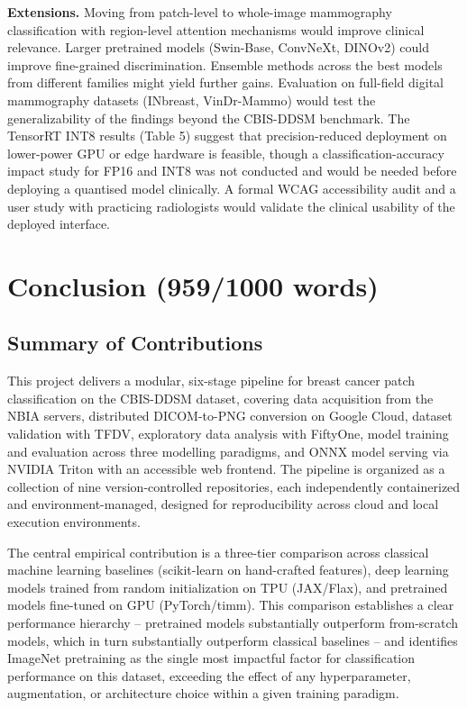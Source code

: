 \documentclass[justified,notoc,openany]{tufte-book}
\begin{document}
\textbf{Extensions.} Moving from patch-level to whole-image mammography classification with region-level attention mechanisms would improve clinical relevance. Larger pretrained models (Swin-Base, ConvNeXt, DINOv2) could improve fine-grained discrimination. Ensemble methods across the best models from different families might yield further gains. Evaluation on full-field digital mammography datasets (INbreast, VinDr-Mammo) would test the generalizability of the findings beyond the CBIS-DDSM benchmark. The TensorRT INT8 results (Table 5) suggest that precision-reduced deployment on lower-power GPU or edge hardware is feasible, though a classification-accuracy impact study for FP16 and INT8 was not conducted and would be needed before deploying a quantised model clinically. A formal WCAG accessibility audit and a user study with practicing radiologists would validate the clinical usability of the deployed interface.

\newpage

\chapter{Conclusion (959/1000 words)}\label{conclusion-9591000-words}

\section{Summary of Contributions}\label{summary-of-contributions}

This project delivers a modular, six-stage pipeline for breast cancer patch classification on the CBIS-DDSM dataset, covering data acquisition from the NBIA servers, distributed DICOM-to-PNG conversion on Google Cloud, dataset validation with TFDV, exploratory data analysis with FiftyOne, model training and evaluation across three modelling paradigms, and ONNX model serving via NVIDIA Triton with an accessible web frontend. The pipeline is organized as a collection of nine version-controlled repositories, each independently containerized and environment-managed, designed for reproducibility across cloud and local execution environments.

The central empirical contribution is a three-tier comparison across classical machine learning baselines (scikit-learn on hand-crafted features), deep learning models trained from random initialization on TPU (JAX/Flax), and pretrained models fine-tuned on GPU (PyTorch/timm). This comparison establishes a clear performance hierarchy -- pretrained models substantially outperform from-scratch models, which in turn substantially outperform classical baselines -- and identifies ImageNet pretraining as the single most impactful factor for classification performance on this dataset, exceeding the effect of any hyperparameter, augmentation, or architecture choice within a given training paradigm.
\end{document}
